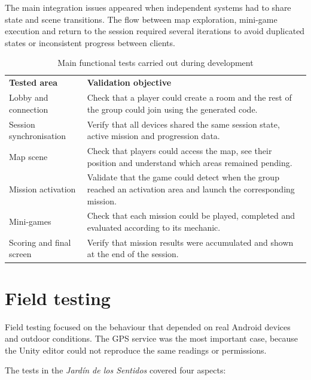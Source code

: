The main integration issues appeared when independent systems had to share state and scene transitions. The flow between map exploration, mini-game execution and return to the session required several iterations to avoid duplicated states or inconsistent progress between clients.
\begin{table}[H]
\centering
\caption{Main functional tests carried out during development}
\label{tab:functional_tests}
\renewcommand{\arraystretch}{1.4}
\begin{tabular}{>{\raggedright\arraybackslash}p{}
                >{\raggedright\arraybackslash}p{}}
\rowcolor[HTML]{B0C9B0}
\textbf{Tested area} & \textbf{Validation objective} \\
\rowcolor[HTML]{F0F5F0}
Lobby and connection & Check that a player could create a room and the rest of the group could join using the generated code. \\
\rowcolor[HTML]{DFE8DF}
Session synchronisation & Verify that all devices shared the same session state, active mission and progression data. \\
\rowcolor[HTML]{F0F5F0}
Map scene & Check that players could access the map, see their position and understand which areas remained pending. \\
\rowcolor[HTML]{DFE8DF}
Mission activation & Validate that the game could detect when the group reached an activation area and launch the corresponding mission. \\
\rowcolor[HTML]{F0F5F0}
Mini-games & Check that each mission could be played, completed and evaluated according to its mechanic. \\
\rowcolor[HTML]{DFE8DF}
Scoring and final screen & Verify that mission results were accumulated and shown at the end of the session. \\
\end{tabular}
\end{table}



\section{Field testing}

Field testing focused on the behaviour that depended on real Android devices and outdoor conditions. The GPS service was the most important case, because the Unity editor could not reproduce the same readings or permissions.

The tests in the \textit{Jardín de los Sentidos} covered four aspects:

